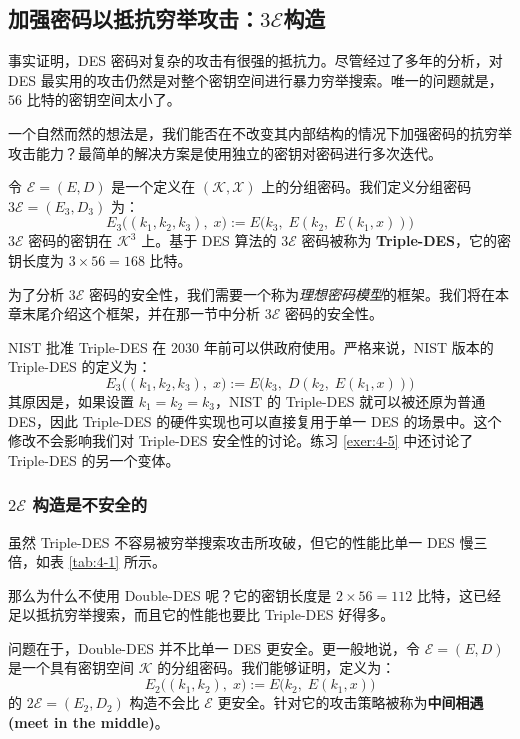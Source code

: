 \subsection{加强密码以抵抗穷举攻击：$3\mathcal{E}$构造}\label{subsec:4-2-3}

事实证明，DES 密码对复杂的攻击有很强的抵抗力。尽管经过了多年的分析，对 DES 最实用的攻击仍然是对整个密钥空间进行暴力穷举搜索。唯一的问题就是，$56$ 比特的密钥空间太小了。

一个自然而然的想法是，我们能否在不改变其内部结构的情况下加强密码的抗穷举攻击能力？最简单的解决方案是使用独立的密钥对密码进行多次迭代。

令 $\mathcal{E}=(E,D)$ 是一个定义在 $(\mathcal{K},\mathcal{X})$ 上的分组密码。我们定义分组密码 $3\mathcal{E}=(E_3,D_3)$ 为：
\[
E_3\big((k_1,k_2,k_3),\;x\big)
:=
E\big(k_3,\;E(k_2,\;E(k_1,x))\big)
\]
$3\mathcal{E}$ 密码的密钥在 $\mathcal{K}^3$ 上。基于 DES 算法的 $3\mathcal{E}$ 密码被称为 \textbf{Triple-DES}，它的密钥长度为 $3\times56=168$ 比特。

\begin{snote}[安全性。]
为了分析 $3\mathcal{E}$ 密码的安全性，我们需要一个称为\emph{理想密码模型}的框架。我们将在本章末尾介绍这个框架，并在那一节中分析 $3\mathcal{E}$ 密码的安全性。
\end{snote}

\begin{snote}
NIST 批准 Triple-DES 在 2030 年前可以供政府使用。严格来说，NIST 版本的 Triple-DES 的定义为：
\[
E_3\big((k_1,k_2,k_3),\;x\big)
:=
E\big(k_3,\;D(k_2,\;E(k_1,x))\big)
\]
其原因是，如果设置 $k_1=k_2=k_3$，NIST 的 Triple-DES 就可以被还原为普通 DES，因此 Triple-DES 的硬件实现也可以直接复用于单一 DES 的场景中。这个修改不会影响我们对 Triple-DES 安全性的讨论。练习 \ref{exer:4-5} 中还讨论了 Triple-DES 的另一个变体。
\end{snote}

\subsubsection{$2\mathcal{E}$ 构造是不安全的}

虽然 Triple-DES 不容易被穷举搜索攻击所攻破，但它的性能比单一 DES 慢三倍，如表 \ref{tab:4-1} 所示。

那么为什么不使用 Double-DES 呢？它的密钥长度是 $2\times56=112$ 比特，这已经足以抵抗穷举搜索，而且它的性能也要比 Triple-DES 好得多。

问题在于，Double-DES 并不比单一 DES 更安全。更一般地说，令 $\mathcal{E}=(E,D)$ 是一个具有密钥空间 $\mathcal{K}$ 的分组密码。我们能够证明，定义为：
\[
E_2\big((k_1,k_2),\;x\big)
:=
E\big(k_2,\;E(k_1,x)\big)
\]
的 $2\mathcal{E}=(E_2,D_2)$ 构造不会比 $\mathcal{E}$ 更安全。针对它的攻击策略被称为\textbf{中间相遇 (meet in the middle)}。

